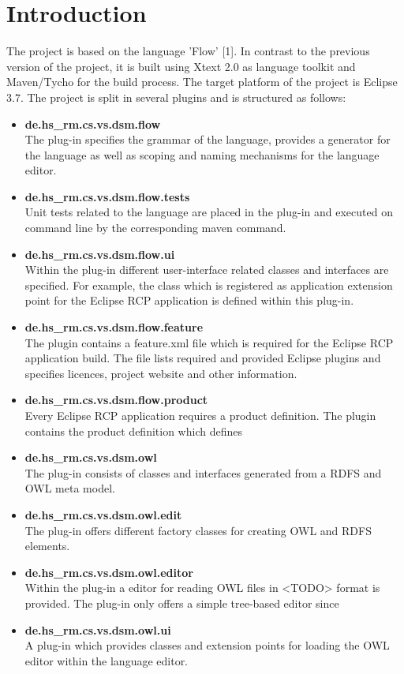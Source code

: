 \section{Introduction}
The project is based on the language 'Flow' [1]. In contrast to the previous 
version of the project, it is built using Xtext 2.0 as language toolkit and 
Maven/Tycho for the build process. The target platform of the project is 
Eclipse 3.7. The project is split in several plugins and is structured as follows:
\begin{itemize}
  \item \textbf{de.hs\_rm.cs.vs.dsm.flow} \\
  The plug-in specifies the grammar of the language, provides a generator for 
  the language as well as scoping and naming mechanisms for the language editor.
  \item \textbf{ de.hs\_rm.cs.vs.dsm.flow.tests} \\
  Unit tests related to the language are placed in the plug-in and executed on 
  command line by the corresponding maven command.
  \item \textbf{de.hs\_rm.cs.vs.dsm.flow.ui} \\
  Within the plug-in different user-interface related classes and interfaces are
  specified. For example, the class which is registered as application extension 
  point for the Eclipse RCP application is defined within this plug-in.
  \item \textbf{de.hs\_rm.cs.vs.dsm.flow.feature} \\
  The plugin contains a feature.xml file which is required for the Eclipse RCP 
  application build. The file lists required and provided Eclipse plugins and 
  specifies licences, project website and other information.
  \item \textbf{de.hs\_rm.cs.vs.dsm.flow.product} \\
  Every Eclipse RCP application requires a product definition. The plugin 
  contains the product definition which defines
  \item \textbf{de.hs\_rm.cs.vs.dsm.owl} \\
  The plug-in consists of classes and interfaces generated from a RDFS and OWL 
  meta model.
  \item \textbf{de.hs\_rm.cs.vs.dsm.owl.edit} \\
  The plug-in offers different factory classes for creating OWL and RDFS 
  elements.
  \item \textbf{de.hs\_rm.cs.vs.dsm.owl.editor} \\
  Within the plug-in a editor for reading OWL files in <TODO> format is 
  provided. The plug-in only offers a simple tree-based editor since
  \item \textbf{de.hs\_rm.cs.vs.dsm.owl.ui} \\
  A plug-in which provides classes and extension points for loading the OWL 
  editor within the language editor. 
\end{itemize}
